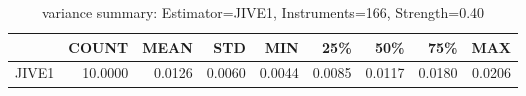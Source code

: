 \begin{table}[ht]
\centering
\caption{variance summary: Estimator=JIVE1, Instruments=166, Strength=0.40}
\begin{tabular}{lrrrrrrrr}
\toprule
 & COUNT & MEAN & STD & MIN & 25\% & 50\% & 75\% & MAX \\
\midrule
JIVE1 & 10.0000 & 0.0126 & 0.0060 & 0.0044 & 0.0085 & 0.0117 & 0.0180 & 0.0206 \\
\bottomrule
\end{tabular}
\end{table}

